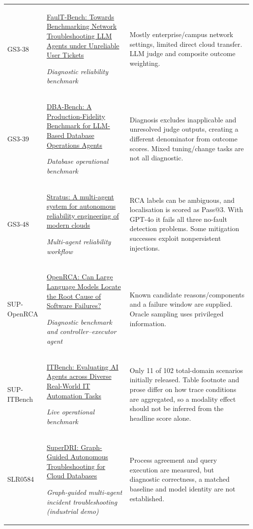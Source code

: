 \begin{longtable}{@{}p{}p{}p{}@{}}
GS3-38 & \href{https://arxiv.org/pdf/2608.27021}{FaulT-Bench: Towards Benchmarking Network Troubleshooting LLM Agents under Unreliable User Tickets}\par\emph{Diagnostic reliability benchmark} & Mostly enterprise/campus network settings, limited direct cloud transfer. LLM judge and composite outcome weighting. \\
GS3-39 & \href{https://arxiv.org/pdf/2607.22165}{DBA-Bench: A Production-Fidelity Benchmark for LLM-Based Database Operations Agents}\par\emph{Database operational benchmark} & Diagnosis excludes inapplicable and unresolved judge outputs, creating a different denominator from outcome scores. Mixed tuning/change tasks are not all diagnostic. \\
GS3-48 & \href{https://proceedings.neurips.cc/paper_files/paper/2025/file/47a6e9e2c3019f13ad94a0f259fe4970-Paper-Conference.pdf}{Stratus: A multi-agent system for autonomous reliability engineering of modern clouds}\par\emph{Multi-agent reliability workflow} & RCA labels can be ambiguous, and localisation is scored as Pass@3. With GPT-4o it fails all three no-fault detection problems. Some mitigation successes exploit nonpersistent injections. \\
SUP-OpenRCA & \href{https://proceedings.iclr.cc/paper_files/paper/2025/file/d29b8d53678015079e1d245c023e49d2-Paper-Conference.pdf}{OpenRCA: Can Large Language Models Locate the Root Cause of Software Failures?}\par\emph{Diagnostic benchmark and controller--executor agent} & Known candidate reasons/components and a failure window are supplied. Oracle sampling uses privileged information. \\
SUP-ITBench & \href{https://tingdai.github.io/files/itbench_ICML25.pdf}{ITBench: Evaluating AI Agents across Diverse Real-World IT Automation Tasks}\par\emph{Live operational benchmark} & Only 11 of 102 total-domain scenarios initially released. Table footnote and prose differ on how trace conditions are aggregated, so a modality effect should not be inferred from the headline score alone. \\
SLR0584 & \href{https://www.vldb.org/pvldb/vol19/p4678-zhu.pdf}{SuperDRI: Graph-Guided Autonomous Troubleshooting for Cloud Databases}\par\emph{Graph-guided multi-agent incident troubleshooting (industrial demo)} & Process agreement and query execution are measured, but diagnostic correctness, a matched baseline and model identity are not established. \\

\end{longtable}
